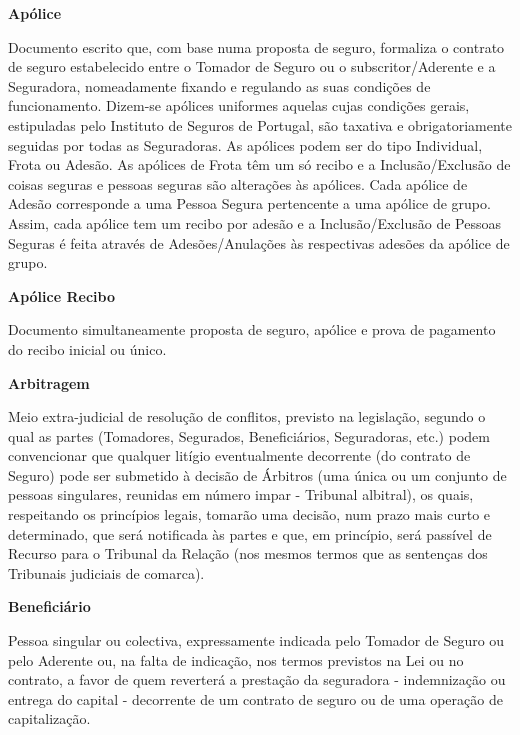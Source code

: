 \begin{description}
\item \textbf{Apólice}

Documento escrito que, com base numa proposta de seguro, formaliza o contrato de seguro estabelecido entre o Tomador de Seguro ou o subscritor/Aderente e a Seguradora, nomeadamente fixando e regulando as suas condições de funcionamento. Dizem-se apólices uniformes aquelas cujas condições gerais, estipuladas pelo Instituto de Seguros de Portugal, são taxativa e obrigatoriamente seguidas por todas as Seguradoras. As apólices podem ser do tipo Individual, Frota ou Adesão. As apólices de Frota têm um só recibo e a Inclusão/Exclusão de coisas seguras e pessoas seguras são alterações às apólices. Cada apólice de Adesão corresponde a uma Pessoa Segura pertencente a uma apólice de grupo. Assim, cada apólice tem um recibo por adesão e a Inclusão/Exclusão de Pessoas Seguras é feita através de Adesões/Anulações às respectivas adesões da apólice de grupo.\end{description}

\begin{description}
\item \textbf{Apólice Recibo}

Documento simultaneamente proposta de seguro, apólice e prova de pagamento do recibo inicial ou único.
\end{description}

\begin{description}
\item \textbf{Arbitragem}

Meio extra-judicial de resolução de conflitos, previsto na legislação, segundo o qual as partes (Tomadores, Segurados, Beneficiários, Seguradoras, etc.) podem convencionar que qualquer litígio eventualmente decorrente (do contrato de Seguro) pode ser submetido à decisão de Árbitros (uma única ou um conjunto de pessoas singulares, reunidas em número impar - Tribunal albitral), os quais, respeitando os princípios legais, tomarão uma decisão, num prazo mais curto e determinado, que será notificada às partes e que, em princípio, será passível de Recurso para o Tribunal da Relação (nos mesmos termos que as sentenças dos Tribunais judiciais de comarca).
\end{description}

\begin{description}
\item \textbf{Beneficiário}

Pessoa singular ou colectiva, expressamente indicada pelo Tomador de Seguro ou pelo Aderente ou, na falta de indicação, nos termos previstos na Lei ou no contrato, a favor de quem reverterá a prestação da seguradora - indemnização ou entrega do capital - decorrente de um contrato de seguro ou de uma operação de capitalização.
\end{description}

